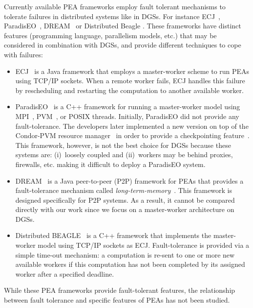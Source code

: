 \documentclass[graybox]{sty/svmult}
\begin{document}
Currently available PEA frameworks employ fault tolerant mechanisms to tolerate failures in distributed systems like in DGSs.
For instance ECJ~\cite{ecj}, ParadisEO~\cite{paradiseo}, DREAM~\cite{dream} or Distributed Beagle
\cite{master-slave-framework-beagle}. These frameworks have distinct features (programming language, parallelism models,
etc.) that may be considered in combination with DGSs, and provide different techniques to cope with failures:
\begin{itemize}
    \item ECJ~\cite{ecj} is a Java framework that employs a master-worker scheme to run PEAs using TCP/IP sockets. When a remote
        worker fails, ECJ handles this failure by rescheduling and restarting the computation to another available worker. 
    \item ParadisEO~\cite{paradiseo} is a C++ framework for running a master-worker model using MPI~\cite{mpi}, PVM~\cite{pvm}, or POSIX threads. Initially, ParadisEO did not provide any fault-tolerance.
        The developers later implemented a new version on top of the Condor-PVM 
        resource manager~\cite{condor-pvm} in order to provide a checkpointing feature~\cite{biblia-checkpointing}.
        This framework, however, is not the best choice for DGSs because these systems are: (i)~loosely coupled 
        and (ii)~workers may be behind proxies, firewalls, etc. making it difficult to deploy a ParadisEO system. 
    \item DREAM~\cite{dream} is a Java peer-to-peer (P2P) framework for PEAs that provides a
        fault-tolerance mechanism called \emph{long-term-memory}~\cite{epidemic-algorithms-fault-tolerance-dream}. This
        framework is designed specifically for P2P systems. As a result, it cannot be compared directly 
        with our work since we focus on a master-worker architecture on DGSs. 
    \item  Distributed BEAGLE~\cite{master-slave-framework-beagle} is a C++ framework that implements the
         master-worker model using TCP/IP sockets as ECJ. Fault-tolerance is provided via a simple time-out
         mechanism: a computation is re-sent to one or more new available workers if
         this computation has not been completed by its assigned worker after a specified deadline.
\end{itemize}
\noindent
While these PEA frameworks provide fault-tolerant features, the relationship between
fault tolerance and specific features of PEAs has not been studied.
\end{document}
